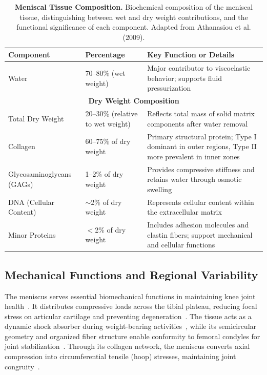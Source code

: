 \begin{table}[H]
    \centering
    \setlength{\tabcolsep}{8pt}
    \begin{tabular}{|p{3.2cm}|p{2.5cm}|p{6.5cm}|}
    \hline
    \rowcolor{gray!20}
    \textbf{Component} & \textbf{Percentage} & \textbf{Key Function or Details} \\ \hline
    Water & 70--80\% (wet weight) & Major contributor to viscoelastic behavior; supports fluid pressurization \\ \hline
    \multicolumn{3}{|c|}{\textbf{Dry Weight Composition}} \\ \hline
    Total Dry Weight & 20--30\% (relative to wet weight) & Reflects total mass of solid matrix components after water removal \\ \hline
    Collagen & 60--75\% of dry weight & Primary structural protein; Type I dominant in outer regions, Type II more prevalent in inner zones \\ \hline
    Glycosaminoglycans (GAGs) & 1--2\% of dry weight & Provides compressive stiffness and retains water through osmotic swelling \\ \hline
    DNA (Cellular Content) & $\sim$2\% of dry weight & Represents cellular content within the extracellular matrix \\ \hline
    Minor Proteins & $<$2\% of dry weight & Includes adhesion molecules and elastin fibers; support mechanical and cellular functions \\ \hline
    \end{tabular}
    \caption[Meniscal Tissue Composition]{\textbf{Meniscal Tissue Composition.} Biochemical composition of the meniscal tissue, distinguishing between wet and dry weight contributions, and the functional significance of each component. Adapted from Athanasiou et al. (2009).}
    \label{tab:meniscus_composition}
\end{table}

\clearpage
\subsection{Mechanical Functions and Regional Variability}

The meniscus serves essential biomechanical functions in maintaining knee joint health~\cite{wang2022advanceselectrospun}.
It distributes compressive loads across the tibial plateau, reducing focal stress on articular cartilage and preventing degeneration~\cite{boschetti2004biomechanicalproperties}.
The tissue acts as a dynamic shock absorber during weight-bearing activities~\cite{du2023meniscusheterogeneity}, while its semicircular geometry and organized fiber structure enable conformity to femoral condyles for joint stabilization~\cite{merriam2015successfultotal}.
Through its collagen network, the meniscus converts axial compression into circumferential tensile (hoop) stresses, maintaining joint congruity~\cite{bahceciogluanatomicalmeniscus, morejon2020compressiveproperties}.

